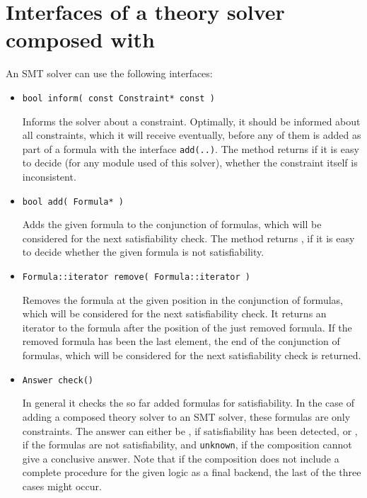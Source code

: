\section{Interfaces of a theory solver composed with \smtrat}
An SMT solver can use the following interfaces:
\begin{itemize}
	\item \begin{verbatim}bool inform( const Constraint* const )\end{verbatim}
		Informs the solver about a constraint. Optimally, it should be informed about all constraints,
        which it will receive eventually, before any of them is added as part of a formula with the 
        interface \texttt{add(..)}. The method returns \false if it is easy to decide (for any module used of this solver), whether 
        the constraint itself is inconsistent.
	\item \begin{verbatim}bool add( Formula* )\end{verbatim}
		Adds the given formula to the conjunction of formulas, which will be considered for the next 
        satisfiability check. The method returns \false, if it is easy to decide whether the given formula is not satisfiability.
	\item \begin{verbatim}Formula::iterator remove( Formula::iterator )\end{verbatim}
		Removes the formula at the given position in the conjunction of formulas,
        which will be considered for the next satisfiability check. It returns an iterator to the
        formula after the position of the just removed formula. If the removed formula has been the 
        last element, the end of the conjunction of formulas, which will be considered for the 
        next satisfiability check is returned.
    \item \begin{verbatim}Answer check()\end{verbatim}
    	In general it checks the so far added formulas for satisfiability. In the case of adding a 
    	\smtrat composed theory solver to an SMT solver, these formulas are only constraints. The answer can either be
    	\true, if satisfiability has been detected, or 
    	\false, if the formulas are not satisfiability, and \texttt{unknown}, if the composition
    	cannot give a conclusive answer. Note that if the composition does not include a complete
    	procedure for the given logic as a final backend, the last of the three cases might occur.

\end{itemize}
